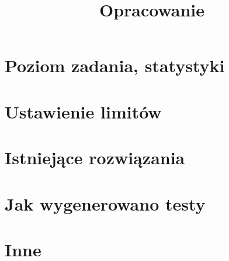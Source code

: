 \documentclass[12pt]{article}
\title{Opracowanie}
\date{} %
\begin{document}
\maketitle

\section{Poziom zadania, statystyki}


\section{Ustawienie limitów}


\section{Istniejące rozwiązania}


\section{Jak wygenerowano testy}


\section{Inne}
\end{document}
